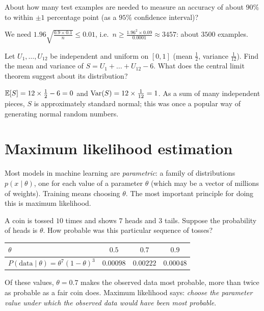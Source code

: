 \begin{exercise}
About how many test examples are needed to measure an accuracy of about $90\%$
to within $\pm1$ percentage point (as a $95\%$ confidence interval)?
\end{exercise}
\begin{solution}
We need $1.96\sqrt{\tfrac{0.9\times0.1}{n}} \le 0.01$, i.e.\ $n \ge
\tfrac{1.96^2\times0.09}{0.0001} \approx 3457$: about $3500$ examples.
\end{solution}

\begin{exercise}
Let $U_1, \dots, U_{12}$ be independent and uniform on $[0, 1]$ (mean
$\tfrac12$, variance $\tfrac1{12}$). Find the mean and variance of
$S = U_1 + \dots + U_{12} - 6$. What does the central limit theorem suggest about
its distribution?
\end{exercise}
\begin{solution}
$\mathbb{E}[S] = 12\times\tfrac12 - 6 = 0$ and $\operatorname{Var}(S) = 12\times\tfrac1{12} = 1$. As a sum
of many independent pieces, $S$ is approximately standard normal; this was once a
popular way of generating normal random numbers.
\end{solution}

\section{Maximum likelihood estimation}\label{sec:mle}

Most models in machine learning are \emph{parametric}: a family of
distributions $p(x \mid \theta)$, one for each value of a parameter $\theta$
(which may be a vector of millions of weights). Training means choosing
$\theta$. The most important principle for doing this is maximum likelihood.

\begin{picturethis}
A coin is tossed $10$ times and shows $7$ heads and $3$ tails. Suppose the
probability of heads is $\theta$. How probable was this particular sequence of
tosses?
\begin{center}
\begin{tabular}{lccc}
\toprule
$\theta$ & $0.5$ & $0.7$ & $0.9$\\
\midrule
$P(\text{data} \mid \theta) = \theta^7(1 - \theta)^3$ & $0.00098$ & $0.00222$ &
  $0.00048$\\
\bottomrule
\end{tabular}
\end{center}
Of these values, $\theta = 0.7$ makes the observed data most probable, more than
twice as probable as a fair coin does. Maximum likelihood says: \emph{choose the
parameter value under which the observed data would have been most probable}.
\end{picturethis}

